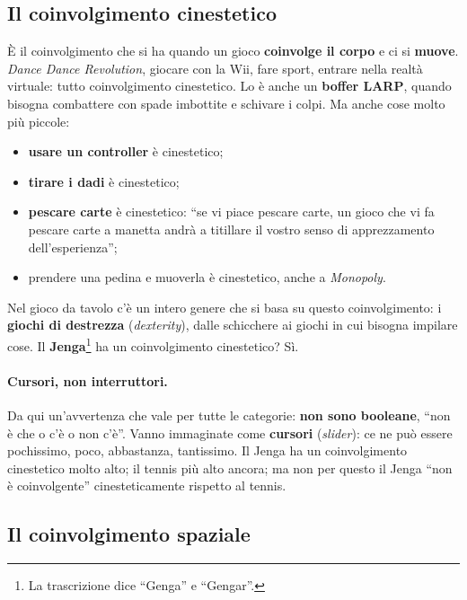 \subsection{Il coinvolgimento cinestetico}
\label{a3:sec:cinestetico}



È il coinvolgimento che si ha quando un gioco \textbf{coinvolge il corpo} e ci si
\textbf{muove}. \emph{Dance Dance Revolution}, giocare con la Wii, fare sport,
entrare nella realtà virtuale: tutto coinvolgimento cinestetico. Lo è anche un
\textbf{boffer LARP}, quando bisogna combattere con spade imbottite e schivare i
colpi. Ma anche cose molto più piccole:
\begin{itemize}
  \item \textbf{usare un controller} è cinestetico;
  \item \textbf{tirare i dadi} è cinestetico;
  \item \textbf{pescare carte} è cinestetico: ``se vi piace pescare carte, un
        gioco che vi fa pescare carte a manetta andrà a titillare il vostro
        senso di apprezzamento dell'esperienza'';
  \item prendere una pedina e muoverla è cinestetico, anche a
        \emph{Monopoly}.
\end{itemize}
Nel gioco da tavolo c'è un intero genere che si basa su questo coinvolgimento:
i \textbf{giochi di destrezza} (\emph{dexterity}), dalle schicchere ai giochi in
cui bisogna impilare cose. Il \textbf{Jenga}\footnote{La trascrizione dice
``Genga'' e ``Gengar''.} ha un coinvolgimento cinestetico? Sì.

\paragraph{Cursori, non interruttori.} Da qui un'avvertenza che vale per tutte
le categorie: \textbf{non sono booleane}, ``non è che o c'è o non c'è''. Vanno
immaginate come \textbf{cursori} (\emph{slider}): ce ne può essere pochissimo,
poco, abbastanza, tantissimo. Il Jenga ha un coinvolgimento cinestetico molto
alto; il tennis più alto ancora; ma non per questo il Jenga ``non è
coinvolgente'' cinesteticamente rispetto al tennis.

\subsection{Il coinvolgimento spaziale}

